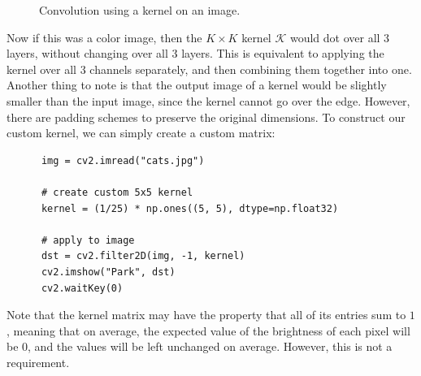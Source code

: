 \documentclass{article}
\begin{document}
    \begin{figure}
      \centering
      \caption{Convolution using a kernel on an image.}
      \label{fig:convolution1}
    \end{figure}

    Now if this was a color image, then the $K \times K$ kernel $\mathcal{K}$ would dot over all 3 layers, without changing over all 3 layers. This is equivalent to applying the kernel over all 3 channels separately, and then combining them together into one. Another thing to note is that the output image of a kernel would be slightly smaller than the input image, since the kernel cannot go over the edge. However, there are padding schemes to preserve the original dimensions. To construct our custom kernel, we can simply create a custom matrix: 
    \begin{lstlisting}
      img = cv2.imread("cats.jpg")

      # create custom 5x5 kernel
      kernel = (1/25) * np.ones((5, 5), dtype=np.float32)

      # apply to image
      dst = cv2.filter2D(img, -1, kernel)
      cv2.imshow("Park", dst)
      cv2.waitKey(0)
    \end{lstlisting}
    Note that the kernel matrix may have the property that all of its entries sum to $1$, meaning that on average, the expected value of the brightness of each pixel will be $0$, and the values will be left unchanged on average. However, this is not a requirement. 
\end{document}
